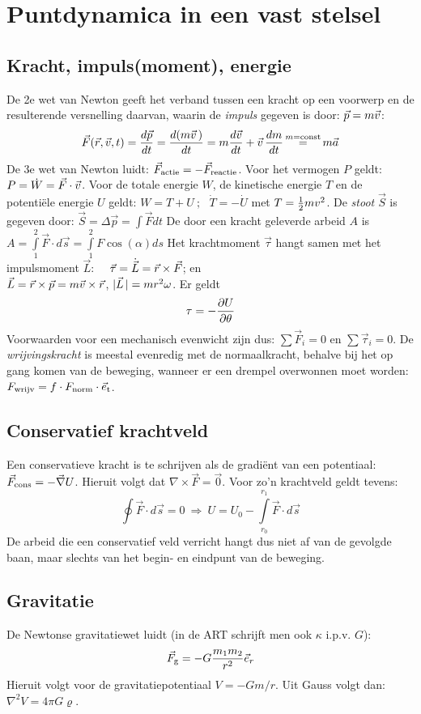 \documentclass[twoside]{report}
\begin{document}
\section{Puntdynamica in een vast stelsel}
\subsection{Kracht, impuls(moment), energie}
De 2e wet van Newton geeft het verband tussen een kracht op een voorwerp en
de resulterende versnelling daarvan, waarin de {\it impuls} gegeven is door:
$\vec{p}=m\vec{v}$:
\[
\vec{F}(\vec{r},\vec{v},t)=\frac{d\vec{p}}{dt}=\frac{d(m\vec{v}\,)}{dt}=m\frac{d\vec{v}}{dt}+
\vec{v}\,\frac{dm}{dt}\mathop{=}\limits^{m={\rm const}}m\vec{a}
\]
De 3e wet van Newton luidt: $\vec{F}_{\rm actie}=-\vec{F}_{\rm reactie}$.
\npar
Voor het vermogen $P$ geldt: $P=\dot{W}=\vec{F}\cdot\vec{v}$. Voor de totale
energie $W$, de kinetische energie $T$ en de potenti\"ele energie $U$ geldt:
$W=T+U~;~~~\dot{T}=-\dot{U}$ met $T=\mbox{$\frac{1}{2}$} mv^2$.
\npar
De {\it stoot} $\vec{S}$ is gegeven door:
$\displaystyle\vec{S}=\Delta\vec{p}=\int\vec{F}dt$
\npar
De door een kracht geleverde arbeid $A$ is
$\displaystyle A=\int\limits_1^2\vec{F}\cdot d\vec{s}=\int\limits_1^2F\cos(\alpha)ds$
\npar
Het krachtmoment $\vec{\tau}$ hangt samen met het impulsmoment $\vec{L}$:~~
$\vec{\tau}=\dot{\vec{L}}=\vec{r}\times\vec{F}$; en\\
$\vec{L}=\vec{r}\times\vec{p}=m\vec{v}\times\vec{r}$, $|\vec{L}\,|=mr^2\omega$. Er geldt
\[
\tau=-\frac{\partial U}{\partial \theta}
\]
Voorwaarden voor een mechanisch evenwicht zijn dus: $\sum\vec{F}_i=0$ en
$\sum\vec{\tau}_i=0$.
\npar
De {\it wrijvingskracht} is meestal evenredig met de normaalkracht, behalve
bij het op gang komen van de beweging, wanneer er een drempel overwonnen
moet worden: $F_{\rm wrijv}=f\cdot F_{\rm norm}\cdot\vec{e}_{\rm t}$.

\subsection{Conservatief krachtveld}
Een conservatieve kracht is te schrijven als de gradi\"ent van een potentiaal:
$\vec{F}_{\rm cons}=-\vec{\nabla}U$. Hieruit volgt dat
$\nabla\times\vec{F}=\vec{0}$. Voor zo'n krachtveld geldt tevens:
\[
\oint\vec{F}\cdot d\vec{s}=0~\Rightarrow~U=U_0-\int\limits_{r_0}^{r_1}\vec{F}\cdot d\vec{s}
\]
De arbeid die een conservatief veld verricht hangt dus niet af van de
gevolgde baan, maar slechts van het begin- en eindpunt van de beweging.

\subsection{Gravitatie}
De Newtonse gravitatiewet luidt (in de ART schrijft men ook $\kappa$ i.p.v. $G$):
\[
\vec{F}_{\rm g}=-G\frac{m_1 m_2}{r^2}\vec{e}_{r}
\]
Hieruit volgt voor de gravitatiepotentiaal $V=-Gm/r$. Uit Gauss volgt dan:
$\nabla^2 V=4\pi G\varrho$.
\end{document}
